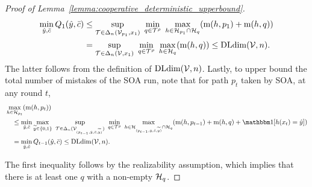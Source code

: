 \documentclass[11pt,letterpaper]{article}
\theoremstyle{definition}
\theoremstyle{plain}
\begin{document}
\begin{proof}[Proof of Lemma~\ref{lemma:cooperative_deterministic_upperbound}]
\begin{align*}
\min_{{\hat{y}},\bar{c}}Q_1({\hat{y}}, \bar{c}) &\leq \sup_{{\mathcal T}\in\Delta_n({\mathcal V}_{p_1},x_1)} ~\min_{q\in{\mathcal T}^\rho} ~\max_{h\in {{\mathcal H}}_{p_1}\cap {{\mathcal H}}_q} (\mathrm{m}(h, p_{1}) + \mathrm{m}(h,q)) \\
&= \sup_{{\mathcal T}\in\Delta_n({\mathcal V},x_1)} ~\min_{q\in{\mathcal T}^\rho} ~\max_{h\in {{\mathcal H}}_q} (\mathrm{m}(h,q)) \leq \mathrm{DLdim}({\mathcal V}, n).
\end{align*}
The latter follows from the definition of $\mathrm{DLdim}({\mathcal V}, n)$.
Lastly, to upper bound the total number of mistakes of the SOA run, note that for path $p_t$ taken by SOA, at any round $t$,
\begin{align*}
&\max_{h\in \H_{p_t}} (\mi(h, p_t)) \\
&\quad\leq
\min_{\hy,\sc} \max_{\vy\in\{0,1\}} ~\sup_{\T\in\Delta_n(\V_{(p_{t-1},\hy, \sc, \vy)})} ~\min_{q\in\T^\rho} ~\max_{h\in \H_{(p_{t-1},\hy, \sc, \vy)}\cap \H_q} (\mi(h, p_{t-1}) + \mi(h,q)+\indct[h(x_t) = \hy]) \\
&\quad= \min_{\hy,\sc}Q_{t-1}(\hy, \sc) \leq \dldim(\V, n).
\end{align*}


The first inequality follows by the realizability assumption, which implies that there is at least one $q$ with a non-empty ${{\mathcal H}}_q$. 
\end{proof}
\end{document}
